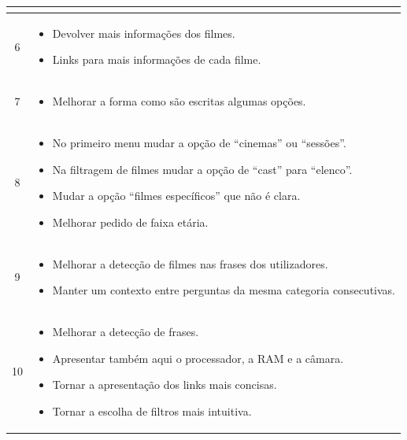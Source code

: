 \documentclass[11pt, a4paper]{article}
\begin{document}
\begin{longtable}{|c|m{12cm}|}
\begin{itemize}[leftmargin=0.5cm]
        \end{itemize}\\ \hline
        6 & \begin{itemize}[leftmargin=0.5cm]
            \setlength\itemsep{0em}
            \item Devolver mais informações dos filmes.
            \item Links para mais informações de cada filme.
        \end{itemize}\\ \hline
        7 & \begin{itemize}[leftmargin=0.5cm]
            \setlength\itemsep{0em}
            \item Melhorar a forma como são escritas algumas opções.
        \end{itemize}\\ \hline
        8 & \begin{itemize}[leftmargin=0.5cm]
            \setlength\itemsep{0em}
            \item No primeiro menu mudar a opção de ``cinemas'' ou ``sessões''.
            \item Na filtragem de filmes mudar a opção de ``cast'' para ``elenco''.
            \item Mudar a opção ``filmes específicos'' que não é clara.
            \item Melhorar pedido de faixa etária.
        \end{itemize}\\ \hline
        9 & \begin{itemize}[leftmargin=0.5cm]
            \setlength\itemsep{0em}
            \item Melhorar a detecção de filmes nas frases dos utilizadores.
            \item Manter um contexto entre perguntas da mesma categoria consecutivas.
        \end{itemize}\\ \hline
        10 & \begin{itemize}[leftmargin=0.5cm]
            \setlength\itemsep{0em}
            \item Melhorar a detecção de frases.
            \item Apresentar também aqui o processador, a RAM e a câmara.
            \item Tornar a apresentação dos links mais concisas.
            \item Tornar a escolha de filtros mais intuitiva.
        \end{itemize}\\ \hline

\end{longtable}
\end{document}
